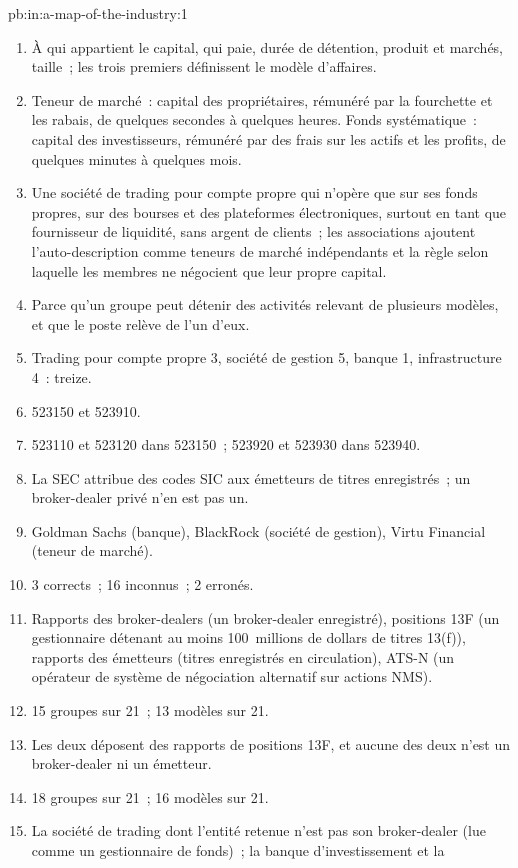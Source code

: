 \begin{solution}{pb:in:a-map-of-the-industry:1}
\begin{enumerate}
\item À qui appartient le capital, qui paie, durée de détention, produit et marchés, taille~; les trois premiers définissent le modèle d'affaires.
\item Teneur de marché~: capital des propriétaires, rémunéré par la fourchette et les rabais, de quelques secondes à quelques heures. Fonds systématique~: capital des
investisseurs, rémunéré par des frais sur les actifs et les profits, de quelques minutes à quelques mois.
\item Une société de trading pour compte propre qui n'opère que sur ses fonds propres, sur des bourses et des plateformes électroniques, surtout en tant que
fournisseur de liquidité, sans argent de clients~; les associations ajoutent l'auto-description comme teneurs de marché indépendants et
la règle selon laquelle les membres ne négocient que leur propre capital.
\item Parce qu'un groupe peut détenir des activités relevant de plusieurs modèles, et que le poste relève de l'un d'eux.
\item Trading pour compte propre 3, société de gestion 5, banque 1, infrastructure 4~: treize.
\item 523150 et 523910.
\item 523110 et 523120 dans 523150~; 523920 et 523930 dans 523940.
\item La SEC attribue des codes SIC aux émetteurs de titres enregistrés~; un broker-dealer privé n'en est pas un.
\item Goldman Sachs (banque), BlackRock (société de gestion), Virtu Financial (teneur de marché).
\item 3 corrects~; 16 inconnus~; 2 erronés.
\item Rapports des broker-dealers (un broker-dealer enregistré), positions 13F (un gestionnaire détenant au moins 100~millions de dollars de
titres 13(f)), rapports des émetteurs (titres enregistrés en circulation), ATS-N (un opérateur de système de négociation
alternatif sur actions NMS).
\item 15 groupes sur 21~; 13 modèles sur 21.
\item Les deux déposent des rapports de positions 13F, et aucune des deux n'est un broker-dealer ni un émetteur.
\item 18 groupes sur 21~; 16 modèles sur 21.
\item La société de trading dont l'entité retenue n'est pas son broker-dealer (lue comme un gestionnaire de fonds)~; la banque d'investissement et la

\end{enumerate}
\end{solution}
